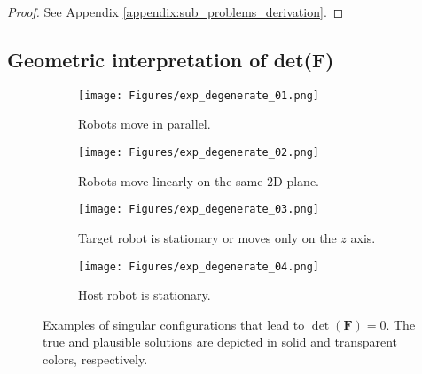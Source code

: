 \documentclass[journal]{IEEEtran}
\def\FIM{\mathbf{F}}
\def\detF{\det(\FIM)}
\begin{document}
\begin{proof}
    See Appendix \ref{appendix:sub_problems_derivation}.
\end{proof}

\subsection{Geometric interpretation of det(F)} \label{subsec:CRLB_geometric_interpretation}

\begin{figure}[t]
    \begin{subfigure}[t]{.495\linewidth}
    \centering
    \texttt{[image: Figures/exp\_degenerate\_01.png]}
    \caption{Robots move in parallel.}
    \label{fig:exp_singular_parallel}
    \end{subfigure}
    \hfill
    \begin{subfigure}[t]{.495\linewidth}
    \centering
    \texttt{[image: Figures/exp\_degenerate\_02.png]}
    \caption{Robots move linearly on the same 2D plane.}
    \label{fig:exp_singular_planar}
    \end{subfigure}
    \begin{subfigure}[t]{0.495\linewidth}
    \centering
    \texttt{[image: Figures/exp\_degenerate\_03.png]}
    \caption{Target robot is stationary or moves only on the $z$ axis.}
    \label{fig:exp_singular_static_target}
    \end{subfigure}
    \hfill
    \begin{subfigure}[t]{.495\linewidth}
    \centering
    \texttt{[image: Figures/exp\_degenerate\_04.png]}
    \caption{Host robot is stationary.}
    \label{fig:exp_singular_static_host}
    \end{subfigure}
    
\caption{Examples of singular configurations that lead to $\detF = 0$. The true and plausible solutions are depicted in solid and transparent colors, respectively.}
\label{fig:exp_degenerate_configs}
\end{figure}
\end{document}
